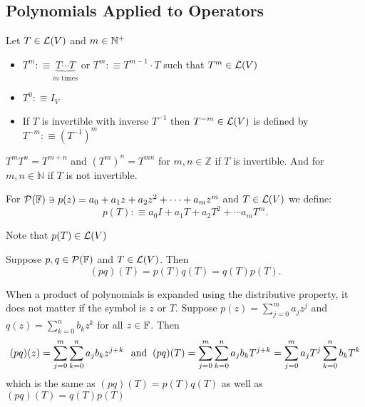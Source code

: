\subsection{Polynomials Applied to Operators}

\setcounter{thm}{12}
\begin{mydef} [notation $T^m$]
  Let $T \in \mathcal{L}(V)$ and $m\in \mathbb{N}^{+}$
  \begin{itemize}
    \item $T^{m} :\equiv \underbrace{T \cdots T}_{\text{$m$ times}}$ or $T^{m} :\equiv T^{m-1} \cdot T$ such that $T^{m} \in \mathcal{L}(V)$
    \item $T^0 :\equiv I_V$
    \item If $T$ is invertible with inverse $T^{-1}$ then $T^{-m}\in \mathcal{L}(V)$ is defined by $T^{-m} :\equiv (T^{-1})^m$
  \end{itemize}
\end{mydef}
$T^m T^n = T^{m+n}$ and $(T^m)^n=T^{mn}$ for $m,n \in \mathbb{Z}$ if $T$ is invertible. And for $m,n \in \mathbb{N}$ if $T$ is not invertible.

\begin{mydef} [notation $p(T)$]
  For $\mathcal{P} (\mathbb{F}) \ni p(z) = a_0+a_1z+a_2z^2+\cdots+a_mz^m$
 and
  $T \in \mathcal{L} (V)$ we define:
  \begin{equation}
    p(T) :\equiv a_0 I + a_1 T + a_2 T^2 + \cdots a_m T^m.
  \end{equation}

  Note that $p(T) \in \mathcal{L}(V)$
\end{mydef}



\setcounter{thm}{16}
\begin{thm} 
  \label{multiplicative-properties}
  Suppose $p,q \in \mathcal{P} (\mathbb{F})$ and $T\in \mathcal{L} (V)$. Then \begin{equation}
    (p q)(T) = p(T) q(T) = q(T)p(T).
  \end{equation}
\end{thm}
\begin{prf} When a product of polynomials is expanded using the distributive property, it does not matter if the symbol is $z$ or $T$. Suppose $p(z) = \sum_{j=0}^{m} a_j z^j$ and $q(z)=\sum_{k=0}^{n} b_k z^k$ for all $z \in \mathbb{F}$. Then  %
  \begin{equation}
    (pq)(z) = \sum_{j=0}^{m} \sum_{k=0}^{n} a_j b_k z^{j+k} \;\;\, \text{and}\;\;
    (pq)(T) = \sum_{j=0}^{m} \sum_{k=0}^{n} a_j b_k T^{j+k}
    = \sum_{j=0}^{m} a_j T^j \sum_{k=0}^{n}  b_k T^k
  \end{equation}
  which is the same as $(pq)(T) = p(T)q(T)$ as well as $(pq)(T) = q(T)p(T)$
\end{prf}

